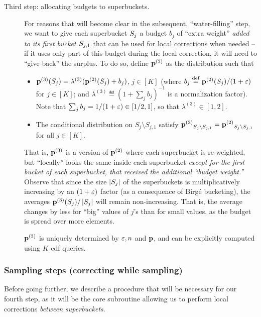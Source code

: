 \begin{description}
  \item[Third step: allocating budgets to superbuckets.] For reasons that will become clear in the subsequent, ``water-filling'' step, we want to give each superbucket $S_j$ a budget $b_j$ of ``extra weight'' \emph{added to its first bucket $S_{j,1}$} that can be used for local corrections when needed -- if it uses only part of this budget during the local correction, it will need to ``give back'' the surplus. To do so, define $\mathbf{p}^{(3)}$ as the distribution such that
\begin{itemize}
  \item $\mathbf{p}^{(3)}(S_j) = \lambda^{(3)} (\mathbf{p}^{(2)}(S_j) + b_j)$, $j\in [K]$ (where $b_j\stackrel{\rm def}{=} \mathbf{p}^{(2)}(S_{j})/(1+\varepsilon)$ for $j \in [K]$; and  $\lambda^{(3)} \eqdef (1 + \sum_j b_j)^{-1}$ is a normalization factor). Note that $\sum_j b_j = 1/(1+\varepsilon) \in [1/2,1]$, so that $\lambda^{(3)}\in[1,2]$.
  \item {The conditional distribution on $S_j\setminus S_{j,1}$ satisfy} ${\mathbf{p}^{(3)}}_{S_j\setminus S_{j,1}} = {\mathbf{p}^{(2)}}_{S_j\setminus S_{j,1}}$ for all $j\in[K]$.
\end{itemize} 
That is, $\mathbf{p}^{(3)}$ is a version of $\mathbf{p}^{(2)}$ where each superbucket is re-weighted, but ``locally'' looks the same inside each superbucket \emph{except for the first bucket of each superbucket, that received the additional ``budget weight.''} Observe that since the size $\left\lvert S_j \right\rvert$ of the superbuckets is multiplicatively increasing by an $(1+\varepsilon)$ factor (as a consequence of Birg\'e bucketing), the averages $\mathbf{p}^{(3)}(S_j)/\left\lvert S_j \right\rvert$ will remain non-increasing.     That is, the average changes by less for ``big'' values of $j$'s than for small values, as the budget is spread over more elements.

\begin{remark}
$\mathbf{p}^{(3)}$ is uniquely determined by $\varepsilon,n$ and $\mathbf{p}$, and can be explicitly computed using $K$ cdf queries.
\end{remark}

\end{description}

\subsubsection{Sampling steps (correcting while sampling)}\label{sec:mon:corr:sampling}
Before going further, we describe a procedure that will be necessary for our fourth step, as it will be the core subroutine allowing us to perform local corrections \emph{between superbuckets}.

